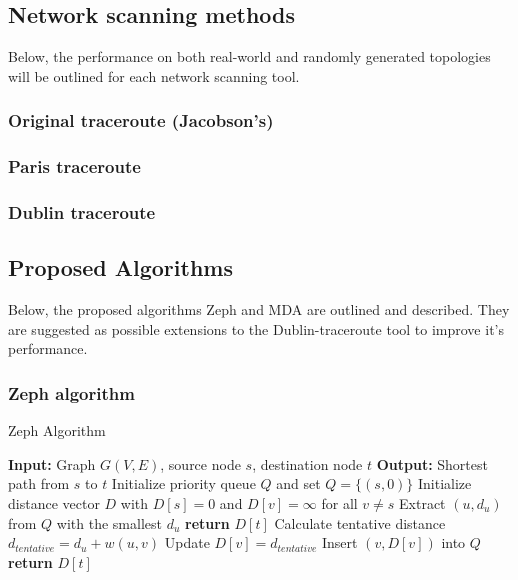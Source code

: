 
\subsection{Network scanning methods}
Below, the performance on both real-world and randomly generated topologies will be outlined for each network scanning tool. 

\subsubsection{Original traceroute (Jacobson's)}

\subsubsection{Paris traceroute}

\subsubsection{Dublin traceroute}

\subsection{Proposed Algorithms}
Below, the proposed algorithms Zeph and MDA are outlined and described. They are suggested as possible extensions to the Dublin-traceroute tool to improve it's performance.  

\subsubsection{Zeph algorithm}

\begin{algorithm}
\caption{Zeph Algorithm}\label{alg:zeph}
\begin{algorithmic}[1]
\State \textbf{Input:} Graph $G(V, E)$, source node $s$, destination node $t$
\State \textbf{Output:} Shortest path from $s$ to $t$
\State Initialize priority queue $Q$ and set $Q = \{(s, 0)\}$
\State Initialize distance vector $D$ with $D[s] = 0$ and $D[v] = \infty$ for all $v \neq s$
    \State Extract $(u, d_u)$ from $Q$ with the smallest $d_u$
        \State \textbf{return} $D[t]$
    \EndIf
        \State Calculate tentative distance $d_{tentative} = d_u + w(u, v)$
            \State Update $D[v] = d_{tentative}$
            \State Insert $(v, D[v])$ into $Q$
        \EndIf
    \EndFor
\EndWhile
\State \textbf{return} $D[t]$ 
\end{algorithmic}
\end{algorithm}

